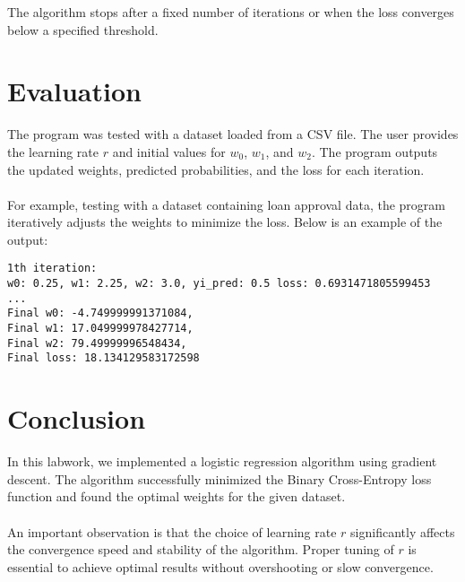 \documentclass{article}
\begin{document}
The algorithm stops after a fixed number of iterations or when the loss converges below a specified threshold.

\section{Evaluation}

The program was tested with a dataset loaded from a CSV file. The user provides the learning rate $r$ 
and initial values for $w_0$, $w_1$, and $w_2$. The program outputs the updated weights, predicted 
probabilities, and the loss for each iteration.\\
\\
For example, testing with a dataset containing loan approval data, the program iteratively adjusts the 
weights to minimize the loss. Below is an example of the output:

\begin{verbatim}
1th iteration:
w0: 0.25, w1: 2.25, w2: 3.0, yi_pred: 0.5 loss: 0.6931471805599453
...
Final w0: -4.749999991371084, 
Final w1: 17.049999978427714, 
Final w2: 79.49999996548434, 
Final loss: 18.134129583172598
\end{verbatim}

\section{Conclusion}

In this labwork, we implemented a logistic regression algorithm using gradient descent. The algorithm 
successfully minimized the Binary Cross-Entropy loss function and found the optimal weights for the 
given dataset.\\
\\
An important observation is that the choice of learning rate $r$ significantly affects the convergence 
speed and stability of the algorithm. Proper tuning of $r$ is essential to achieve optimal results 
without overshooting or slow convergence.
\end{document}
